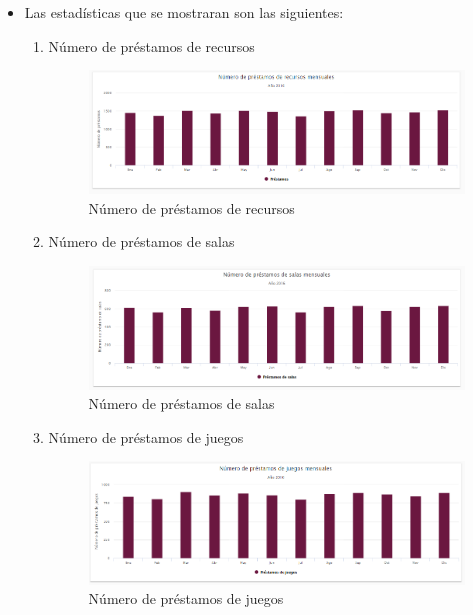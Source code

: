\begin{itemize}
	\item  Las estadísticas que se mostraran son las siguientes:
	\begin{enumerate}
		
		\item Número de préstamos de recursos
		\begin{figure}[hbtp]
	\includegraphics[scale=0.5]{images/Interfaz/IUGS15_recursosMes.PNG}
	\caption{Número de préstamos de recursos}
	\end{figure}
	
	\item Número de préstamos de salas
	\begin{figure}[hbtp]
	\includegraphics[scale=0.5]{images/Interfaz/IUGS15_salasMes.PNG}
	\caption{Número de préstamos de salas}
	\end{figure}
	
	\item Número de préstamos de juegos
	\begin{figure}[hbtp]
	\includegraphics[scale=0.5]{images/Interfaz/IUGS15_juegosMes.PNG}
	\caption{Número de préstamos de juegos}
	\end{figure}
	

\end{enumerate}
\end{itemize}
